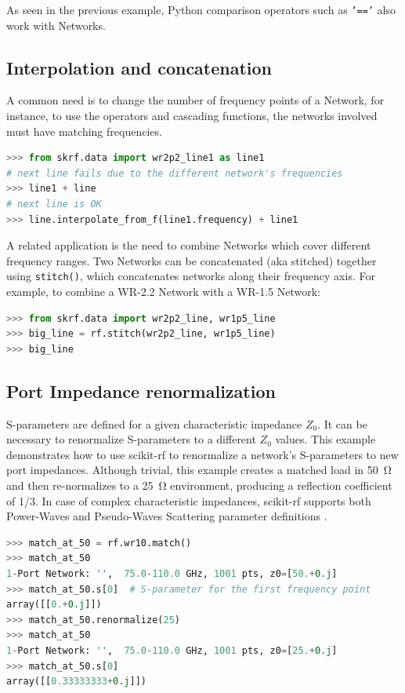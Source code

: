 \documentclass{IEEEjmw}
\begin{document}
As seen in the previous example, Python comparison operators such as \texttt{'=='} also work with Networks. 

\subsection{Interpolation and concatenation}
A common need is to change the number of frequency points of a Network, for instance, to use the operators and cascading functions, the networks involved must have matching frequencies.

\begin{lstlisting}[language=Python]
>>> from skrf.data import wr2p2_line1 as line1
# next line fails due to the different network's frequencies
>>> line1 + line 
# next line is OK
>>> line.interpolate_from_f(line1.frequency) + line1  
\end{lstlisting}

A related application is the need to combine Networks which cover different frequency ranges. Two Networks can be concatenated (aka stitched) together using \texttt{stitch()}, which concatenates networks along their frequency axis. For example, to combine a WR-2.2 Network with a WR-1.5 Network:

\begin{lstlisting}[language=Python]
>>> from skrf.data import wr2p2_line, wr1p5_line
>>> big_line = rf.stitch(wr2p2_line, wr1p5_line)
>>> big_line
\end{lstlisting}

\subsection{Port Impedance renormalization}
S-parameters are defined for a given characteristic impedance $Z_0$. It can be necessary to renormalize S-parameters to a different $Z_0$ values. This example demonstrates how to use scikit-rf to renormalize a network's S-parameters to new port impedances. Although trivial, this example creates a matched load in \SI{50}{\ohm} and then re-normalizes to a \SI{25}{\ohm} environment, producing a reflection coefficient of 1/3. In case of complex characteristic impedances, scikit-rf supports both Power-Waves and Pseudo-Waves Scattering parameter definitions \cite{williams2013}.

\begin{lstlisting}[language=Python]
>>> match_at_50 = rf.wr10.match()
>>> match_at_50
1-Port Network: '',  75.0-110.0 GHz, 1001 pts, z0=[50.+0.j]
>>> match_at_50.s[0]  # S-parameter for the first frequency point
array([[0.+0.j]])
>>> match_at_50.renormalize(25)
>>> match_at_50
1-Port Network: '',  75.0-110.0 GHz, 1001 pts, z0=[25.+0.j]
>>> match_at_50.s[0]
array([[0.33333333+0.j]])
\end{lstlisting}
\end{document}
